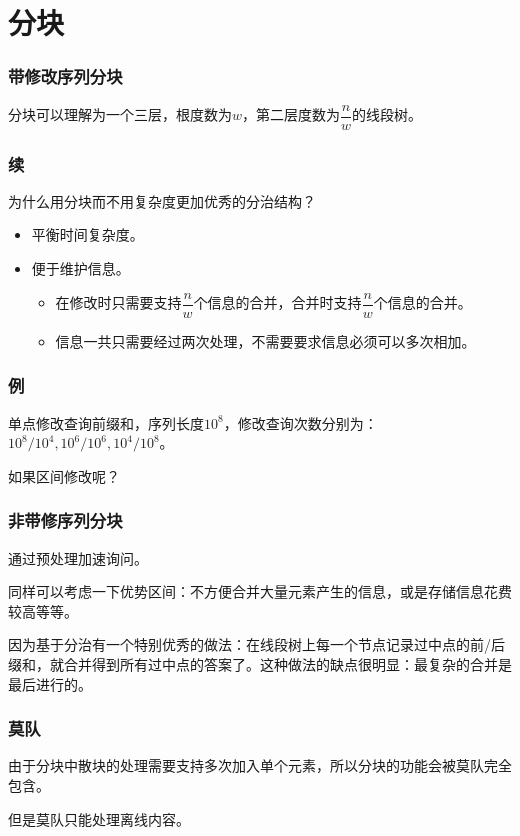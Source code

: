 \documentclass[10pt]{beamer}
\begin{document}
	\section{分块}
	\begin{frame}
		\frametitle{带修改序列分块}

		分块可以理解为一个三层，根度数为$w$，第二层度数为$\dfrac nw$的线段树。

	\end{frame}
	\begin{frame}
		\frametitle{续}
	
		为什么用分块而不用复杂度更加优秀的分治结构？

		\begin{itemize}
			\item 平衡时间复杂度。
			\item 便于维护信息。
			\begin{itemize}
				\item 在修改时只需要支持$\dfrac nw$个信息的合并，合并时支持$\dfrac nw$个信息的合并。
				\item 信息一共只需要经过两次处理，不需要要求信息必须可以多次相加。
			\end{itemize}
		\end{itemize}
	
	\end{frame}
	\begin{frame}
		\frametitle{例}
	
		单点修改查询前缀和，序列长度$10^8$，修改查询次数分别为：$10^8/10^4,10^6/10^6,10^4/10^8$。

		如果区间修改呢？
	
	\end{frame}
	\begin{frame}
		\frametitle{非带修序列分块}
	
		通过预处理加速询问。

		同样可以考虑一下优势区间：不方便合并大量元素产生的信息，或是存储信息花费较高等等。

		因为基于分治有一个特别优秀的做法：在线段树上每一个节点记录过中点的前/后缀和，就合并得到所有过中点的答案了。这种做法的缺点很明显：最复杂的合并是最后进行的。
	
	\end{frame}
	\begin{frame}
		\frametitle{莫队}
	
		由于分块中散块的处理需要支持多次加入单个元素，所以分块的功能会被莫队完全包含。

		但是莫队只能处理离线内容。
	
	\end{frame}
\end{document}
